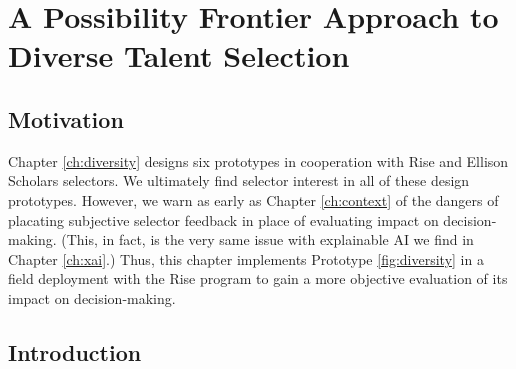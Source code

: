\chapter{\label{ch:spf}A Possibility Frontier Approach to Diverse Talent Selection}

\minitoc

\section{Motivation}
Chapter \ref{ch:diversity} designs six prototypes in cooperation with Rise and Ellison Scholars selectors. We ultimately find selector interest in all of these design prototypes. However, we warn as early as Chapter \ref{ch:context} of the dangers of placating subjective selector feedback in place of evaluating impact on decision-making. (This, in fact, is the very same issue with explainable AI we find in Chapter \ref{ch:xai}.) Thus, this chapter implements Prototype \ref{fig:diversity} in a field deployment with the Rise program to gain a more objective evaluation of its impact on decision-making.

\section{Introduction}\label{sec:spfintro}

